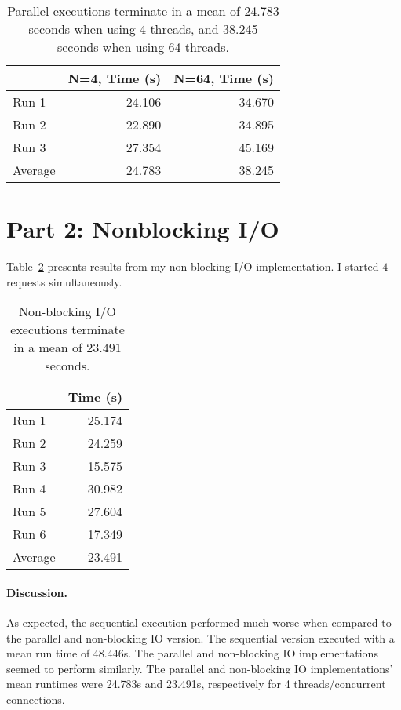 \documentclass[12pt]{article}
\begin{document}
\begin{table}[H]
  \centering
  \begin{tabular}{lrr}
    & {\bf N=4, Time (s)} & {\bf N=64, Time (s)} \\
    \hline
    Run 1 & 24.106 & 34.670 \\
    Run 2 & 22.890 & 34.895 \\
    Run 3 & 27.354 & 45.169 \\
    \hline
    Average & 24.783 & 38.245 \\
  \end{tabular}
  \caption{\label{tbl_parallel}Parallel executions terminate in a mean of 24.783 seconds when using 4 threads, and 38.245 seconds when using 64 threads.}
\end{table}

\section*{Part 2: Nonblocking I/O}

Table~\ref{tbl_nbio} presents results from my non-blocking I/O implementation. I started $4$ requests
simultaneously.

\begin{table}[H]
  \centering
  \begin{tabular}{lr}
    & {\bf Time (s)} \\
    \hline
    Run 1 & 25.174 \\
    Run 2 & 24.259 \\
    Run 3 & 15.575 \\
    Run 4 & 30.982 \\
    Run 5 & 27.604 \\
    Run 6 & 17.349 \\
    \hline
    Average & 23.491 \\
  \end{tabular}
  \caption{\label{tbl_nbio}Non-blocking I/O executions terminate in a mean of $23.491$ seconds.}
\end{table}

\paragraph{Discussion.} As expected, the sequential execution performed much worse when compared to the parallel and non-blocking IO version. The sequential version executed with a mean run time of 48.446s. The parallel and non-blocking IO implementations seemed to perform similarly. The parallel and non-blocking IO implementations' mean runtimes were 24.783s and 23.491s, respectively for 4 threads/concurrent connections.
\end{document}
